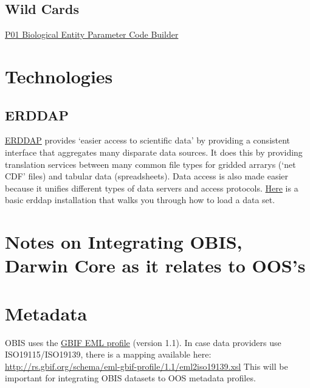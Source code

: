 \documentclass[]{book}
\begin{document}
\hypertarget{wild-cards}{%
\subsection{Wild Cards}\label{wild-cards}}

\href{\%22https://www.bodc.ac.uk/resources/vocabularies/vocabulary_builder/biomodel/\%22}{P01 Biological Entity Parameter Code Builder}

\hypertarget{technologies}{%
\section{Technologies}\label{technologies}}

\hypertarget{erddap}{%
\subsection{ERDDAP}\label{erddap}}

\href{\%22https://coastwatch.pfeg.noaa.gov/erddap/index.html\%22}{ERDDAP} provides `easier access to scientific data' by providing a consistent interface that aggregates many disparate data sources. It does this by providing translation services between many common file types for gridded arrarys (`net CDF' files) and tabular data (spreadsheets). Data access is also made easier because it unifies different types of data servers and access protocols. \href{\%22https://github.com/HakaiInstitute/erddap-basic\%22}{Here} is a basic erddap installation that walks you through how to load a data set.

\hypertarget{notes-on-integrating-obis-darwin-core-as-it-relates-to-ooss}{%
\section{Notes on Integrating OBIS, Darwin Core as it relates to OOS's}\label{notes-on-integrating-obis-darwin-core-as-it-relates-to-ooss}}

\hypertarget{metadata}{%
\section{Metadata}\label{metadata}}

OBIS uses the \href{http://rs.gbif.org/schema/eml-gbif-profile/1.1/eml-gbif-profile.xsd}{GBIF EML profile} (version 1.1). In case data providers use ISO19115/ISO19139, there is a mapping available here: \url{http://rs.gbif.org/schema/eml-gbif-profile/1.1/eml2iso19139.xsl} This will be important for integrating OBIS datasets to OOS metadata profiles.
\end{document}
